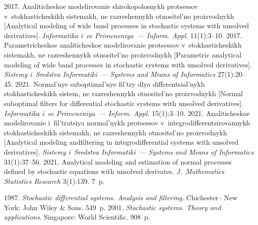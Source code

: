   \begin{multicols}{2}

\renewcommand{\bibname}{\protect\rmfamily References}

{\small\frenchspacing
 {%
 \begin{thebibliography}{99}
 2017. 
Analiticheskoe modelirovanie shirokopolosnykh protsessov v~stokhasticheskikh sistemakh, 
ne razreshennykh otnositel'no proizvodnykh [Analytical modeling of wide band processes in 
stochastic systems with unsolved derivatives]. \textit{Informatika i~ee Primeneniya~--- Inform. Appl.}
 11(1):3--10.
 2017. Parametricheskoe analiticheskoe modelirovanie protsessov 
v~stokhasticheskikh sistemakh, ne razreshennykh otnositel'no proizvodnykh 
[Parametric analytical modeling of wide band processes in stochastic systems 
with unsolved derivatives]. \textit{Sistemy i~Sredstva Informatiki~--- 
Systems and Means of Informatics} 27(1):20--45.
 2021. Normal'nye suboptimal'nye fil'try dlya 
differentsial'nykh stokhasticheskikh sistem, ne razreshennykh otnositel'no proizvodnykh 
[Normal suboptimal filters for differential stochastic systems with unsolved derivatives]. 
\textit{Informatika i~ee Primeneniya~--- Inform. Appl.} 15(1):3--10.
 2021. Ana\-li\-ti\-che\-skoe mo\-de\-li\-ro\-va\-nie i~fil't\-ra\-tsiya
nor\-mal'\-nykh pro\-tses\-sov v~in\-teg\-ro\-dif\-fe\-ren\-tsi\-ro\-van\-nykh 
sto\-kha\-sti\-che\-skikh sis\-te\-makh, 
ne raz\-re\-shen\-nykh ot\-no\-si\-tel'\-no pro\-iz\-vod\-nykh
[Analytical modeling and\linebreak filtering in integrodifferential systems with unsolved derivatives]. 
\textit{Sistemy i~Sredstva Informatiki~--- Systems and Means of Informatics} 31(1):37--56.
 2021. Analytical modeling and estimation of normal processes defined
 by stochastic equations with unsolved derivates. \textit{J.~Mathematics Statistics Research} 3(1):139. 7~p.
 
 1987. \textit{Stochastic differential systems. Analysis and filtering}. Chichester\,--\,New York: John Wiley \& Sons. 
 549~p.
 2001. \textit{Stochastic systems. Theory and  applications}.
Singapore: World Scientific. 908~p.



\end{thebibliography}}}
\end{multicols}
